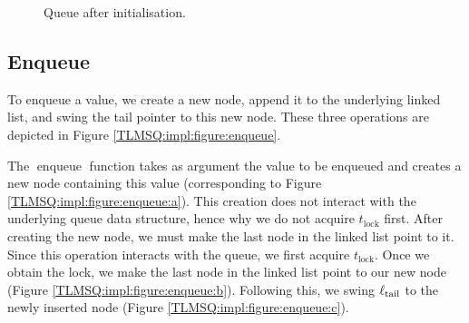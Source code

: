 \documentclass[a4paper, 10pt]{report}
\theoremstyle{definition}
\newcommand{\enqueue}{\operatorname{enqueue}}
\newcommand{\locinM}[1]{\loc_{#1\_\mathrm{in}}}
\newcommand{\locoutM}[1]{\loc_{#1\_\mathrm{out}}}
\newcommand{\locN}[1]{\loc_{\mathrm{#1}}}
\newcommand{\lochead}{\locN{head}}
\newcommand{\loctail}{\locN{tail}}
\newcommand{\node}{x}
\newcommand{\Tlock}{t_{\mathrm{lock}}}
\begin{document}
\begin{figure}
  \centering
  \begin{adjustbox}{center}
  \end{adjustbox}
  \caption{Queue after initialisation.}
  \label{TLMSQ:impl:figure:init}
\end{figure}

\subsection{Enqueue}
\label{TLMSQ:implementation:sub:enqueue}

To enqueue a value, we create a new node, append it to the underlying linked list, and swing the tail pointer to this new node. These three operations are depicted in Figure \ref{TLMSQ:impl:figure:enqueue}.

The $\enqueue$ function takes as argument the value to be enqueued and creates a new node containing this value (corresponding to Figure \ref{TLMSQ:impl:figure:enqueue:a}). This creation does not interact with the underlying queue data structure, hence why we do not acquire $\Tlock$ first. After creating the new node, we must make the last node in the linked list point to it. Since this operation interacts with the queue, we first acquire $\Tlock$. Once we obtain the lock, we make the last node in the linked list point to our new node (Figure \ref{TLMSQ:impl:figure:enqueue:b}). Following this, we swing $\loctail$ to the newly inserted node (Figure \ref{TLMSQ:impl:figure:enqueue:c}).
\end{document}
